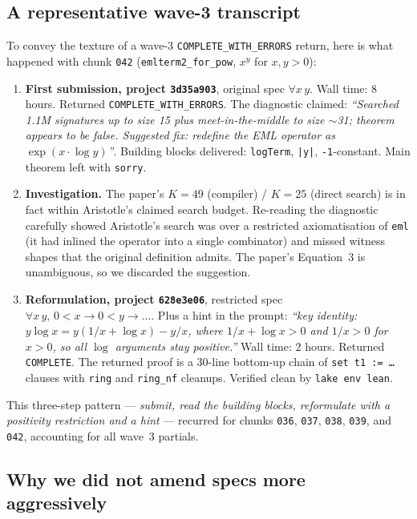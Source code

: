 \documentclass[11pt,a4paper]{article}
\theoremstyle{plain}
\theoremstyle{definition}
\begin{document}
\subsection{A representative wave-3 transcript}

To convey the texture of a wave-3 \texttt{COMPLETE\_WITH\_ERRORS}
return, here is what happened with chunk \texttt{042}
(\texttt{emlterm2\_for\_pow}, $x^y$ for $x,y>0$):

\begin{enumerate}[leftmargin=*]
\item\textbf{First submission, project \texttt{3d35a903}}, original
spec $\forall x\,y$.  Wall time: 8 hours.  Returned
\texttt{COMPLETE\_WITH\_ERRORS}.  The diagnostic claimed:
\emph{``Searched 1.1M signatures up to size 15 plus meet-in-the-middle to
size $\sim$31; theorem appears to be false.  Suggested fix: redefine the
EML operator as $\exp(x\cdot\log y)$''}.  Building blocks delivered:
\texttt{logTerm}, \texttt{|y|}, \texttt{-1}-constant.  Main theorem
left with \texttt{sorry}.

\item\textbf{Investigation.}  The paper's $K=49$ (compiler) /
$K=25$ (direct search) is in fact within Aristotle's claimed
search budget.  Re-reading the diagnostic carefully showed
Aristotle's search was over a restricted axiomatisation of \texttt{eml}
(it had inlined the operator into a single combinator) and missed
witness shapes that the original definition admits.  The paper's
Equation~3 is unambiguous, so we discarded the suggestion.

\item\textbf{Reformulation, project \texttt{628e3e06}}, restricted spec
$\forall x\,y,\,0<x\to 0<y\to\dots$.  Plus a hint in the prompt:
\emph{``key identity: $y\log x = y(1/x+\log x) - y/x$, where
$1/x+\log x>0$ and $1/x>0$ for $x>0$, so all $\log$ arguments stay
positive.''}  Wall time: 2 hours.  Returned \texttt{COMPLETE}.  The
returned proof is a 30-line bottom-up chain of \texttt{set t1 := \dots}
clauses with \texttt{ring} and \texttt{ring\_nf} cleanups.  Verified
clean by \texttt{lake env lean}.
\end{enumerate}

This three-step pattern --- \emph{submit, read the building blocks,
reformulate with a positivity restriction and a hint} --- recurred for
chunks \texttt{036}, \texttt{037}, \texttt{038}, \texttt{039}, and
\texttt{042}, accounting for all wave~3 partials.

\subsection{Why we did not amend specs more aggressively}
\end{document}
